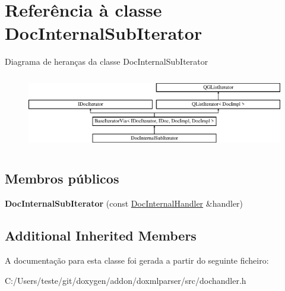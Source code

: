 \hypertarget{class_doc_internal_sub_iterator}{\section{Referência à classe Doc\-Internal\-Sub\-Iterator}
\label{class_doc_internal_sub_iterator}
}
Diagrama de heranças da classe Doc\-Internal\-Sub\-Iterator\begin{figure}[H]
\begin{center}
\leavevmode
\includegraphics[height=3.294118cm]{class_doc_internal_sub_iterator}
\end{center}
\end{figure}
\subsection*{Membros públicos}
\begin{DoxyCompactItemize}
\item 
\hypertarget{class_doc_internal_sub_iterator_ab8538e95542af7c2401a181974533c04}{{\bfseries Doc\-Internal\-Sub\-Iterator} (const \hyperlink{class_doc_internal_handler}{Doc\-Internal\-Handler} \&handler)}\label{class_doc_internal_sub_iterator_ab8538e95542af7c2401a181974533c04}

\end{DoxyCompactItemize}
\subsection*{Additional Inherited Members}


A documentação para esta classe foi gerada a partir do seguinte ficheiro\-:\begin{DoxyCompactItemize}
\item 
C\-:/\-Users/teste/git/doxygen/addon/doxmlparser/src/dochandler.\-h\end{DoxyCompactItemize}
